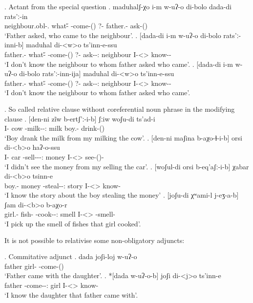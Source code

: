 \ex. Actant from the special question
	\ag. maduhalʃ-χo i-m w-uʔ-o di-bolo dada-di rats'ː-in\\
			{neighbour.obl-\Add.\Lat} {what-\H} {\M-come-\Pst(\Aor)} {?-\Indef} {father.\Obl-\Erg} {ask-\Pst(\Aor)}\\
			\glt `Father asked, who came to the neighbour'.
	\bg. [dada-di i-m w-uʔ-o di-bolo rats'ː-inni-b]  maduhal di-<w>o ts'inn-e-ssu\\
		{father.\Obl-\Erg}  {what-\H} {\M-come-\Pst(\Aor)} {?-\Indef} {ask-\Pst-\Ptcp:\Pst} neighbour {I-<\M>\Aff} {know-\Hab-\Neg}\\
		\glt `I don't know the neighbour to whom father asked who came'.
	\bg. [dada-di i-m w-uʔ-o di-bolo rats'ː-inn-ija]  maduhal di-<w>o ts'inn-e-ssu\\
		{father.\Obl-\Erg}  {what-\H} {\M-come-\Pst(\Aor)} {?-\Indef} {ask-\Npst-\Ptcp:\Pres} neighbour {I-<\M>\Aff} {know-\Hab-\Neg}\\
		\glt `I don't know the neighbour to whom father asked who came'.

\ex. So called relative clause without coreferential noun phrase in the modifying clause
	\ag. [den-ni zĩw b-ertʃ'ː-i-b] ʃːiw woʃu-di ts'ad-i\\
			{I-\Erg} cow {\An-milk-\Pst-\Ptcp:\Pst} milk {boy.\Obl-\Erg} {drink-\Pst(\Aor)}\\
			\glt `Boy drank the milk from my milking the cow'.
	\bg. [den-ni maʃina b-aχo-ɬ-i-b] orsi di-<b>o haʔ-o-ssu\\
			 {I-\Erg}  car {\Nanf-sell-\Caus-\Pst-\Ptcp:\Pst} money {I-<\Nanf>\Aff} {see-\Pst(\Aor)-\Neg}\\
			 \glt `I didn't see the money from my selling the car'.
	\bg. [woʃul-di orsi b-eq'aʃː-i-b] χabar di-<b>o tsinn-e\\
			{boy.\Obl-\Erg} money {\Nanf-steal-\Pst-\Ptcp:\Pst} story {I-<\Nanf>\Aff} {know-\Hab}\\
			\glt `I know the story about the boy stealing the money'
	\bg. [joʃu-di χʷami-l j-eʒ-a-b] ʃam di-<b>o b-aχo-r\\
			{girl.\Obl-\Erg} {fish-\Pl} {\F-cook-\Pst-\Ptcp:\Pst} smell {I-<\Nanf>\Aff} {\Nanf-smell-\Prog}\\
			\glt `I pick up the smell of fishes that girl cooked'.
			 
It is not possible to relativise some non-obligatory adjuncts:

\ex. Commitative adjunct
	\ag. dada joʃi-loj w-uʔ-o\\
			father {girl-\Com} {\M-come-\Pst(\Aor)}\\
			\glt `Father came with the daughter'.	
	\bg. *[dada w-uʔ-o-b] joʃi di-<j>o ts'inn-e\\
			father {\M-come-\Pst-\Ptcp:\Pst} girl {I-<\F>\Aff} {know-\Hab}\\
			\glt `I know the daughter that father came with'.

